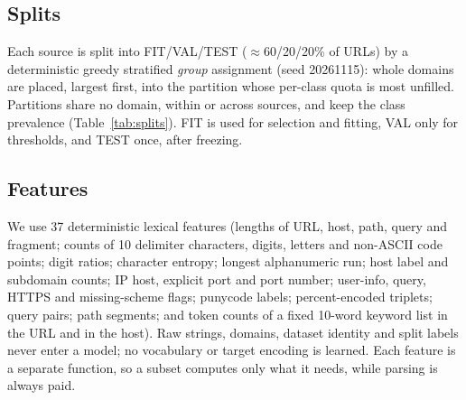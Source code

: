 \begin{table}[t]
\caption{Cohort attrition (each URL counted once, at the first stage that removed it).}
\label{tab:attrition}
\centering\scriptsize

\end{table}

\subsection{Splits}
Each source is split into FIT/VAL/TEST ($\approx$60/20/20\% of URLs) by a deterministic greedy stratified \emph{group} assignment (seed 20261115): whole domains are placed, largest first, into the partition whose per-class quota is most unfilled. Partitions share no domain, within or across sources, and keep the class prevalence (Table~\ref{tab:splits}). FIT is used for selection and fitting, VAL only for thresholds, and TEST once, after freezing.

\begin{table}[t]
\caption{Group-disjoint partitions.}
\label{tab:splits}
\centering\scriptsize

\end{table}

\subsection{Features}
We use 37 deterministic lexical features (lengths of URL, host, path, query and fragment; counts of 10 delimiter characters, digits, letters and non-ASCII code points; digit ratios; character entropy; longest alphanumeric run; host label and subdomain counts; IP host, explicit port and port number; user-info, query, HTTPS and missing-scheme flags; punycode labels; percent-encoded triplets; query pairs; path segments; and token counts of a fixed 10-word keyword list in the URL and in the host). Raw strings, domains, dataset identity and split labels never enter a model; no vocabulary or target encoding is learned. Each feature is a separate function, so a subset computes only what it needs, while parsing is always paid.

